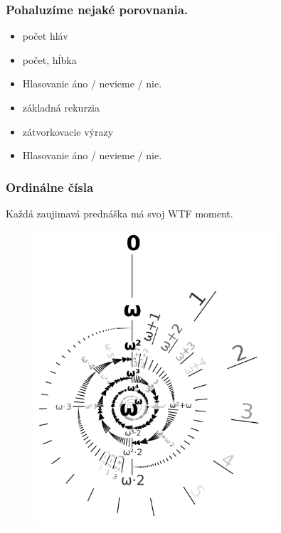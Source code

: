 \documentclass[12pt,a4paper]{article}
\begin{document}
\subsubsection*{Pohaluzíme nejaké porovnania.}
\begin{itemize} 
\item počet hláv
\item počet, hĺbka
\item Hlasovanie áno / nevieme / nie. 
\item základná rekurzia 
\item zátvorkovacie výrazy
\item Hlasovanie áno / nevieme / nie. 
\end{itemize} 

\subsubsection*{Ordinálne čísla}
Každá zaujimavá prednáška má svoj WTF moment. 
\begin{figure}[H]
\centering
\includegraphics[width=0.8\textwidth]{ordinals.png}
\end{figure} 
\end{document}
